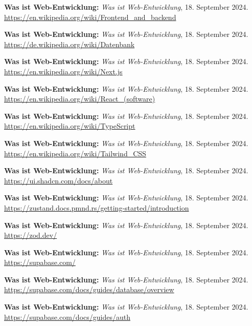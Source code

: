 \begin{literature}
\textbf{Was ist Web-Entwicklung:} \textit{Was ist Web-Entwicklung}, 18. September 2024. \url{https://en.wikipedia.org/wiki/Frontend_and_backend}

\textbf{Was ist Web-Entwicklung:} \textit{Was ist Web-Entwicklung}, 18. September 2024. \url{https://de.wikipedia.org/wiki/Datenbank}

\textbf{Was ist Web-Entwicklung:} \textit{Was ist Web-Entwicklung}, 18. September 2024. \url{https://en.wikipedia.org/wiki/Next.js}


\textbf{Was ist Web-Entwicklung:} \textit{Was ist Web-Entwicklung}, 18. September 2024. \url{https://en.wikipedia.org/wiki/React_(software)}


\textbf{Was ist Web-Entwicklung:} \textit{Was ist Web-Entwicklung}, 18. September 2024. \url{https://en.wikipedia.org/wiki/TypeScript}

\textbf{Was ist Web-Entwicklung:} \textit{Was ist Web-Entwicklung}, 18. September 2024. \url{https://en.wikipedia.org/wiki/Tailwind_CSS}

\textbf{Was ist Web-Entwicklung:} \textit{Was ist Web-Entwicklung}, 18. September 2024. \url{https://ui.shadcn.com/docs/about}

\textbf{Was ist Web-Entwicklung:} \textit{Was ist Web-Entwicklung}, 18. September 2024. \url{https://zustand.docs.pmnd.rs/getting-started/introduction}

\textbf{Was ist Web-Entwicklung:} \textit{Was ist Web-Entwicklung}, 18. September 2024. \url{https://zod.dev/}

\textbf{Was ist Web-Entwicklung:} \textit{Was ist Web-Entwicklung}, 18. September 2024. \url{https://supabase.com/}

\textbf{Was ist Web-Entwicklung:} \textit{Was ist Web-Entwicklung}, 18. September 2024. \url{https://supabase.com/docs/guides/database/overview}

\textbf{Was ist Web-Entwicklung:} \textit{Was ist Web-Entwicklung}, 18. September 2024. \url{https://supabase.com/docs/guides/auth}


\end{literature}
